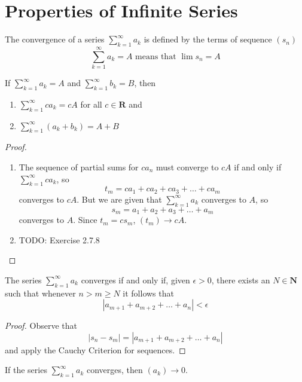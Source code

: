 \section{Properties of Infinite Series}
    The convergence of a series $\sum_{k=1}^\infty a_k$ is defined by the terms of sequence $(s_n)$
    \begin{equation*}
        \sum_{k=1}^\infty a_k = A \text{ means that } \lim s_n = A
    \end{equation*}
    \begin{theorem}
        If $\sum_{k=1}^\infty a_k = A$ and $\sum_{k=1}^\infty b_k = B$, then
        \begin{enumerate}
            \item $\sum_{k=1}^\infty ca_k = cA$ for all $c \in \textbf{R}$ and
            \item $\sum_{k=1}^\infty (a_k + b_k) = A + B$
        \end{enumerate}
    \end{theorem}
    \begin{proof}
        \begin{enumerate}
            \item The sequence of partial sums for $ca_n$ must converge to $cA$ if and only if $\sum_{k=1}^\infty ca_k$, so
            $$t_m = ca_1 + ca_2 + ca_3 + \dots + ca_m$$
            converges to $cA$. But we are given that $\sum_{k=1}^\infty a_k$ converges to $A$, so 
            $$s_m = a_1 + a_2 + a_3 + \dots + a_m$$
            converges to $A$. Since $t_m = cs_m$, $(t_m) \rightarrow cA$.
            \item TODO: Exercise 2.7.8
        \end{enumerate}
    \end{proof}
    \begin{theorem}
        The series $\sum_{k=1}^\infty a_k$ converges if and only if, given $\epsilon > 0$, there exists an $N \in \textbf{N}$ such that whenever $n > m \geq N$ it follows that 
        $$|a_{m+1} + a_{m+2} + \dots + a_n| < \epsilon$$
    \end{theorem}
    \begin{proof}
        Observe that
        $$|s_n - s_m| = |a_{m+1} + a_{m+2} + \dots + a_n|$$
        and apply the Cauchy Criterion for sequences.
    \end{proof}
    \begin{theorem}
        If the series $\sum_{k=1}^\infty a_k$ converges, then $(a_k) \rightarrow 0$.
    \end{theorem}

